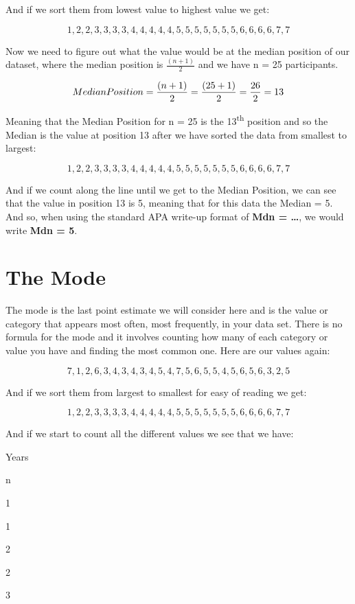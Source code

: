 \documentclass[
  oneside]{book}
\begin{document}
And if we sort them from lowest value to highest value we get:

\[1, 2, 2, 3, 3, 3, 3, 4, 4, 4, 4, 4, 5, 5, 5, 5, 5, 5, 5, 6, 6, 6, 6, 7, 7\]

Now we need to figure out what the value would be at the median position of our dataset, where the median position is \(\frac{(n + 1)}{2}\) and we have n = 25 participants.

\[Median\space Position = \frac{(n + 1)}{2} = \frac{(25 + 1)}{2} = \frac{26}{2} = 13\]

Meaning that the Median Position for n = 25 is the 13\textsuperscript{th} position and so the Median is the value at position 13 after we have sorted the data from smallest to largest:

\[1, 2, 2, 3, 3, 3, 3, 4, 4, 4, 4, 4, 5, 5, 5, 5, 5, 5, 5, 6, 6, 6, 6, 7, 7\]

And if we count along the line until we get to the Median Position, we can see that the value in position 13 is 5, meaning that for this data the Median = 5. And so, when using the standard APA write-up format of \textbf{Mdn = \ldots{}}, we would write \textbf{Mdn = 5}.

\hypertarget{the-mode}{%
\section{The Mode}\label{the-mode}}

The mode is the last point estimate we will consider here and is the value or category that appears most often, most frequently, in your data set. There is no formula for the mode and it involves counting how many of each category or value you have and finding the most common one. Here are our values again:

\[7, 1, 2, 6, 3, 4, 3, 4, 3, 4, 5, 4, 7, 5, 6, 5, 5, 4, 5, 6, 5, 6, 3, 2, 5\]

And if we sort them from largest to smallest for easy of reading we get:

\[1, 2, 2, 3, 3, 3, 3, 4, 4, 4, 4, 4, 5, 5, 5, 5, 5, 5, 5, 6, 6, 6, 6, 7, 7\]

And if we start to count all the different values we see that we have:

Years

n

1

1

2

2

3
\end{document}
